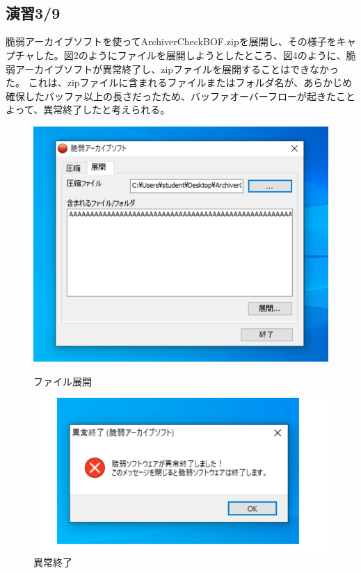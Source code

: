 \documentclass[dvipdfmx,autodetect-engine,titlepage]{jsarticle}
\begin{document}
　\\\\
\subsection{演習3/9}
脆弱アーカイブソフトを使ってArchiverCheckBOF.zipを展開し、その様子をキャプチャした。図2のようにファイルを展開しようとしたところ、図4のように、脆弱アーカイブソフトが異常終了し、zipファイルを展開することはできなかった。
これは、zipファイルに含まれるファイルまたはフォルダ名が、あらかじめ確保したバッファ以上の長さだったため、バッファオーバーフローが起きたことよって、異常終了したと考えられる。

\begin{figure}[H]
  \centering
  \begin{minipage}[b]{0.45\linewidth}
  \begin{center}
    \includegraphics[keepaspectratio,scale=0.5]{fg3.png}
    \end{center}
    \caption{ファイル展開}
  \end{minipage}
  \begin{minipage}[b]{0.45\linewidth}
  \begin{center}
    \includegraphics[keepaspectratio,scale=0.6]{fg4.png}
    \end{center}
    \caption{異常終了}
  \end{minipage}
\end{figure}
\end{document}
